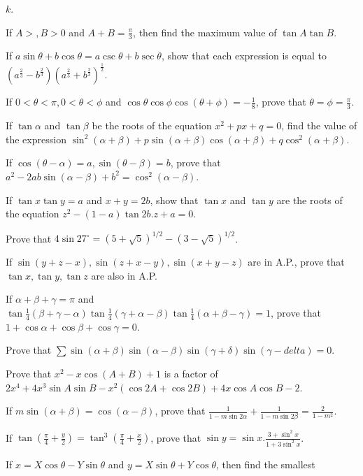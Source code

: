   $k$.
\item If $A > , B > 0$ and $A + B = \frac{\pi}{3}$, then find the maximum value of $\tan A\tan B$.
\item If $a\sin\theta + b\cos\theta = a\csc\theta + b\sec\theta$, show that each expression is equal to
  $\left(a^{\frac{2}{3}} - b^{\frac{2}{3}}\right)\left(a^{\frac{2}{3}} +
  b^{\frac{2}{3}}\right)^{\frac{1}{2}}$.
\item If $0 < \theta < \pi, 0 < \theta < \phi$ and $\cos\theta\cos\phi\cos(\theta + \phi) = -\frac{1}{8}$,
  prove that $\theta = \phi = \frac{\pi}{3}$.
\item If $\tan\alpha$ and $\tan\beta$ be the roots of the equation $x^2 + px + q = 0$, find the value of the
  expression $\sin^2(\alpha + \beta) + p\sin(\alpha + \beta)\cos(\alpha + \beta) + q\cos^2(\alpha + \beta)$.
\item If $\cos(\theta - \alpha) = a, \sin(\theta - \beta) = b$, prove that $a^2 - 2ab\sin(\alpha - \beta) +
  b^2 = \cos^2(\alpha - \beta)$.
\item If $\tan x\tan y = a$ and $x + y = 2b$, show that $\tan x$ and $\tan y$ are the roots of the equation
  $z^2 - (1 - a)\tan2b.z + a = 0$.
\item Prove that $4\sin27^\circ = (5 + \sqrt{5})^{1/2} - (3 - \sqrt{5})^{1/2}$.
\item If $\sin(y + z - x), \sin(z + x - y), \sin(x + y - z)$ are in A.P., prove that $\tan x, \tan y, \tan
  z$ are also in A.P.
\item If $\alpha + \beta + \gamma = \pi$ and $\tan\frac{1}{4}(\beta + \gamma - \alpha)\tan\frac{1}{4}(\gamma
  + \alpha - \beta)\tan\frac{1}{4}(\alpha + \beta - \gamma) = 1$, prove that $1 + \cos\alpha + \cos\beta
  + \cos\gamma = 0$.
\item Prove that $\sum\sin(\alpha + \beta)\sin(\alpha - \beta)\sin(\gamma + \delta)\sin(\gamma - delta) =
  0$.
\item Prove that $x^2 - x\cos(A + B) + 1$ is a factor of $2x^4 + 4x^3\sin A\sin B - x^2(\cos2A + \cos2B) +
  4x\cos A\cos B - 2$.
\item If $m\sin(\alpha + \beta) = \cos(\alpha - \beta)$, prove that $\frac{1}{1 - m\sin2\alpha} + \frac{1}{1
  - m\sin2\beta} = \frac{2}{1 - m^2}$.
\item If $\tan\left(\frac{\pi}{4} + \frac{y}{2}\right) = \tan^3\left(\frac{\pi}{4} + \frac{x}{2}\right)$,
  prove that $\sin y = \sin  x.\frac{3 + \sin^2x}{1 + 3\sin^2x}$.
\item If $x = X\cos\theta - Y\sin\theta$ and $y = X\sin\theta + Y\cos\theta$, then find the smallest
